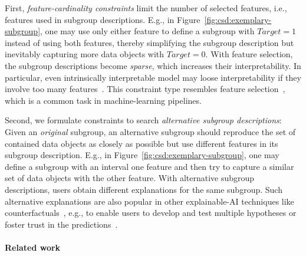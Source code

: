 \documentclass{article}
\theoremstyle{definition}
\begin{document}
First, \emph{feature-cardinality constraints} limit the number of selected features, i.e., features used in subgroup descriptions.
E.g., in Figure~\ref{fig:csd:exemplary-subgroup}, one may use only either feature to define a subgroup with $\mathit{Target} = 1$ instead of using both features, thereby simplifying the subgroup description but inevitably capturing more data objects with $\mathit{Target} = 0$.
With feature selection, the subgroup descriptions become \emph{sparse}, which increases their interpretability.
In particular, even intrinsically interpretable model may loose interpretability if they involve too many features~\cite{molnar2020interpretable}.
This constraint type resembles feature selection~\cite{guyon2003introduction, li2017feature}, which is a common task in machine-learning pipelines.

Second, we formulate constraints to search \emph{alternative subgroup descriptions}:
Given an \emph{original} subgroup, an alternative subgroup should reproduce the set of contained data objects as closely as possible but use different features in its subgroup description.
E.g., in Figure~\ref{fig:csd:exemplary-subgroup}, one may define a subgroup with an interval one feature and then try to capture a similar set of data objects with the other feature.
With alternative subgroup descriptions, users obtain different explanations for the same subgroup.
Such alternative explanations are also popular in other explainable-AI techniques like counterfactuals~\cite{mothilal2020explaining, russell2019efficient}, e.g., to enable users to develop and test multiple hypotheses or foster trust in the predictions~\cite{kim2021multi, wang2019designing}.

\paragraph{Related work}
\end{document}
